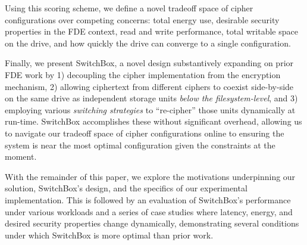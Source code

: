 Using this scoring scheme, we define a novel tradeoff space of cipher
configurations over competing concerns: total energy use, desirable security
properties in the FDE context, read and write performance, total writable space
on the drive, and how quickly the drive can converge to a single configuration.

Finally, we present SwitchBox, a novel design substantively expanding on prior
FDE work by 1) decoupling the cipher implementation from the encryption
mechanism, 2) allowing ciphertext from different ciphers to coexist side-by-side
on the same drive as independent storage units \textit{below the
filesystem-level}, and 3) employing various \emph{switching strategies} to
``re-cipher'' those units dynamically at run-time. SwitchBox accomplishes these
without significant overhead, allowing us to navigate our tradeoff space of
cipher configurations online to ensuring the system is near the most optimal
configuration given the constraints at the moment.

With the remainder of this paper, we explore the motivations underpinning our
solution, SwitchBox's design, and the specifics of our experimental
implementation. This is followed by an evaluation of SwitchBox's performance
under various workloads and a series of case studies where latency, energy, and
desired security properties change dynamically, demonstrating several conditions
under which SwitchBox is more optimal than prior work.
